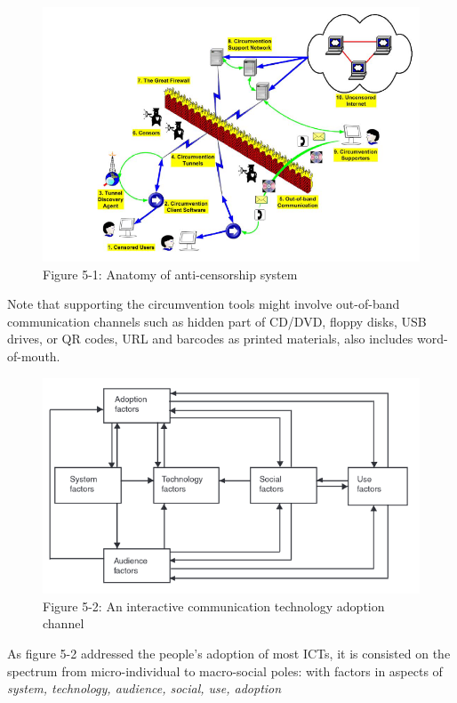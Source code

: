 \documentclass[sigconf]{acmart}
\begin{document}
\begin{figure}
\centering
\includegraphics{./res/5.1-anatomy.png}
\caption{Figure 5-1: Anatomy of anti-censorship system}
\end{figure}

Note that supporting the circumvention tools might involve out-of-band
communication channels such as hidden part of CD/DVD, floppy disks, USB
drives, or QR codes, URL and barcodes as printed materials, also
includes word-of-mouth.

\begin{figure}
\centering
\includegraphics{./res/5.2-adoption.png}
\caption{Figure 5-2: An interactive communication technology adoption
channel}
\end{figure}

As figure 5-2 \cite{49_ICTAdopt} addressed the people's adoption of most
ICTs, it is consisted on the spectrum from micro-individual to
macro-social poles: with factors in aspects of \emph{system, technology,
audience, social, use, adoption}
\end{document}
